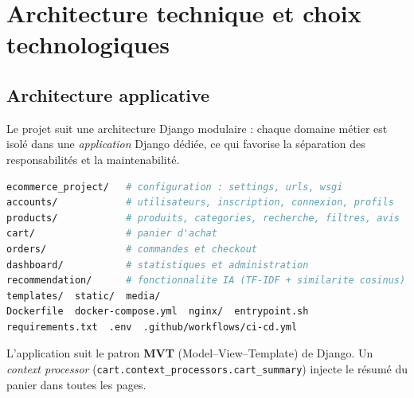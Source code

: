 \documentclass[11pt,a4paper]{report}
\begin{document}
\chapter{Architecture technique et choix technologiques}

\section{Architecture applicative}
Le projet suit une architecture Django modulaire : chaque domaine métier est isolé
dans une \emph{application} Django dédiée, ce qui favorise la séparation des
responsabilités et la maintenabilité.

\begin{lstlisting}[language=bash,caption={Arborescence du projet},captionpos=b]
ecommerce_project/   # configuration : settings, urls, wsgi
accounts/            # utilisateurs, inscription, connexion, profils
products/            # produits, categories, recherche, filtres, avis
cart/                # panier d'achat
orders/              # commandes et checkout
dashboard/           # statistiques et administration
recommendation/      # fonctionnalite IA (TF-IDF + similarite cosinus)
templates/  static/  media/
Dockerfile  docker-compose.yml  nginx/  entrypoint.sh
requirements.txt  .env  .github/workflows/ci-cd.yml
\end{lstlisting}

L'application suit le patron \textbf{MVT} (Model–View–Template) de Django. Un
\emph{context processor} (\texttt{cart.context\_processors.cart\_summary}) injecte
le résumé du panier dans toutes les pages.
\end{document}
